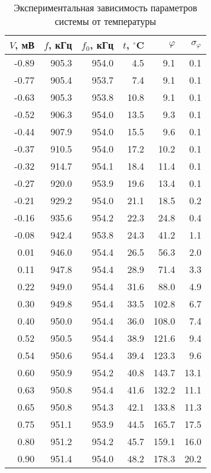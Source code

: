 

\begin{table}[h]
    \centering
    \caption{Экспериментальная зависимость параметров системы от температуры}
\begin{tabular}{rrrrrr}
\toprule
    $V$, мВ &     $f$, кГц &    $f_0$, кГц &    $t$, ${}^\circ$C &  $\varphi$ &  $\sigma_{\varphi}$ \\
\midrule
-0.89 & 905.3 & 954.0 &  4.5 &    9.1 &    0.1 \\
-0.77 & 905.4 & 953.7 &  7.4 &    9.1 &    0.1 \\
-0.63 & 905.3 & 953.8 & 10.8 &    9.1 &    0.1 \\
-0.52 & 906.3 & 954.0 & 13.5 &    9.3 &    0.1 \\
-0.44 & 907.9 & 954.0 & 15.5 &    9.6 &    0.1 \\
-0.37 & 910.5 & 954.0 & 17.2 &   10.2 &    0.1 \\
-0.32 & 914.7 & 954.1 & 18.4 &   11.4 &    0.1 \\
-0.27 & 920.0 & 953.9 & 19.6 &   13.4 &    0.1 \\
-0.21 & 929.2 & 954.0 & 21.1 &   18.5 &    0.2 \\
-0.16 & 935.6 & 954.2 & 22.3 &   24.8 &    0.4 \\
-0.08 & 942.4 & 953.8 & 24.3 &   41.2 &    1.1 \\
 0.01 & 946.0 & 954.4 & 26.5 &   56.3 &    2.0 \\
 0.11 & 947.8 & 954.4 & 28.9 &   71.4 &    3.3 \\
 0.22 & 949.0 & 954.4 & 31.6 &   88.0 &    4.9 \\
 0.30 & 949.8 & 954.4 & 33.5 &  102.8 &    6.7 \\
 0.40 & 950.0 & 954.4 & 36.0 &  108.0 &    7.4 \\
 0.52 & 950.5 & 954.4 & 38.9 &  121.6 &    9.4 \\
 0.54 & 950.6 & 954.4 & 39.4 &  123.3 &    9.6 \\
 0.60 & 950.9 & 954.2 & 40.8 &  143.7 &   13.1 \\
 0.63 & 950.8 & 954.4 & 41.6 &  132.2 &   11.1 \\
 0.65 & 950.8 & 954.3 & 42.1 &  133.8 &   11.3 \\
 0.75 & 951.1 & 953.9 & 44.5 &  165.7 &   17.5 \\
 0.80 & 951.2 & 954.2 & 45.7 &  159.1 &   16.0 \\
 0.90 & 951.4 & 954.0 & 48.2 &  178.3 &   20.2 \\
\bottomrule
\end{tabular}
\end{table}